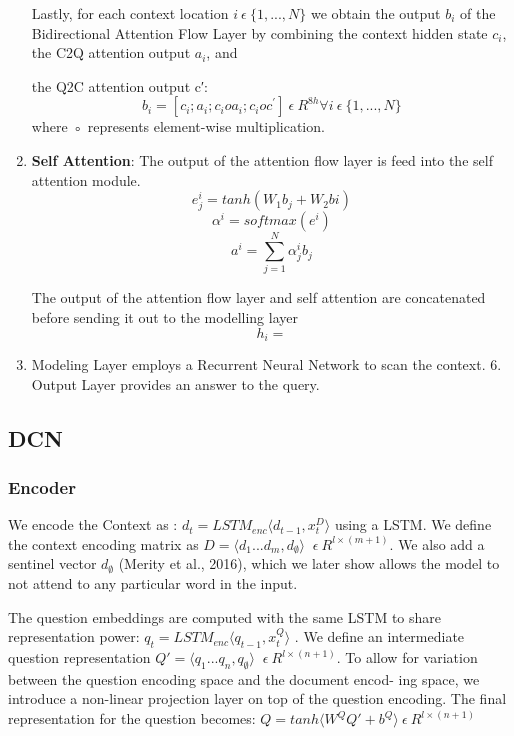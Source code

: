 \documentclass{article} %
\begin{document}
\begin{enumerate}
Lastly, for each context location $i \ \epsilon \ \{1,...,N\}$ we obtain the output $b_i$ of the Bidirectional Attention Flow Layer by combining the context hidden state $c_i$, the C2Q attention output $a_i$, and

the Q2C attention output c′:
$$b_{i} =[c_{i};a_{i};c_{i}oa_{i};c_{i} o c^{'}] \ \epsilon \ R^{8h} \forall i \ \epsilon \ \{1,...,N\}$$
where ◦ represents element-wise multiplication.

\item \textbf{Self Attention}: The output of the attention flow layer is feed into the self attention module.
$$e^{i}_{j} = tanh(W_{1}b_{j} + W_{2}b{i})$$
$$\alpha^{i} = softmax(e^{i})$$
$$a^{i} = \sum_{j=1}^{N}\alpha^{i}_{j}b_{j}$$

The output of the attention flow layer and self attention are concatenated before sending it out to the modelling layer
$$h_{i} = $$

\item Modeling Layer employs a Recurrent Neural Network to scan the context. 6. Output Layer provides an answer to the query.
\end{enumerate}




\subsection{DCN}

\subsubsection{Encoder}
We encode the Context as : $d_{t} = LSTM_{enc} \langle d_{t-1},x^{D}_{t} \rangle $ using a LSTM. 
We define the context encoding matrix as $ D = \langle d_{1} ...d_{m},d_{\emptyset} \rangle $ $ \ \epsilon \  R^{l\times(m+1)} $.
We also add a sentinel vector $ d_{\emptyset} $ (Merity et al., 2016), which we later show allows the model to not attend to any particular word in the input.

The question embeddings are computed with the same LSTM to share representation power: $ q_{t} =LSTM_{enc} \langle q_{t-1} , x^{Q}_{t} \rangle $ .
We define an intermediate question representation $ Q′ = \langle q_{1} . . . q_{n},q_{\emptyset} \rangle $ $ \ \epsilon \  R^{l\times(n+1)} $.
To allow for variation between the question encoding space and the document encod- ing space, we introduce a non-linear projection layer on top of the question encoding. 
The final representation for the question becomes: $ Q = tanh \langle   W^Q Q′ + b^Q \rangle \  \epsilon \  R^{l\times(n+1)} $
\end{document}
